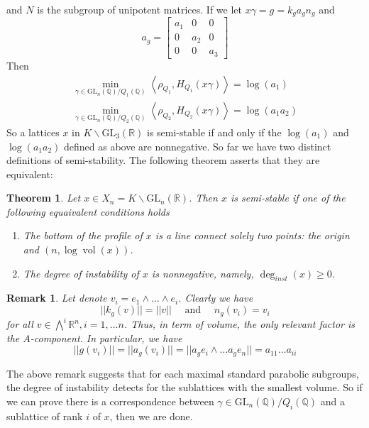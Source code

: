 \documentclass[12pt]{article} %
\newtheorem{theorem}{Theorem}
\newtheorem*{remark}{Remark}
\DeclareMathOperator{\vol}{vol}
\begin{document}
and $N$ is the subgroup of unipotent matrices. If we let $ x\gamma = g = k_ga_gn_g$ and
\[a_g = \begin{bmatrix}
        a_1 & 0   & 0   \\
        0   & a_2 & 0   \\
        0   & 0   & a_3
    \end{bmatrix}\]
Then
\begin{align*}
    \min_{\gamma \in \text{GL}_n(\mathbb{Q})/Q_1(\mathbb{Q})}\left\langle \rho_{Q_1}, H_{Q_1}(x\gamma) \right\rangle = \log(a_1) \\ \min_{\gamma \in \text{GL}_n(\mathbb{Q})/Q_2(\mathbb{Q})}\left\langle \rho_{Q_2}, H_{Q_2}(x\gamma) \right\rangle = \log(a_1a_2)
\end{align*}
So a lattices $x$ in $K \backslash\text{GL}_3(\mathbb{R})$  is semi-stable if and only if the $\log(a_1)$ and $\log(a_1a_2)$ defined as above are nonnegative.
So far we have two distinct definitions of semi-stability. The following theorem asserts that they are equivalent:
\begin{theorem}
    Let $x \in X_n = K \backslash \text{GL}_n(\mathbb{R})$. Then $x$ is semi-stable if one of the following equaivalent
    conditions holds
    \begin{enumerate}
        \item The bottom of the profile of $x$ is a line connect solely two points: the origin and $(n,\log\vol(x))$.
        \item The degree of instability of $x$ is nonnegative, namely, $\deg_{inst}(x) \ge 0$.
    \end{enumerate}
\end{theorem}
\begin{remark}
    Let denote $v_i = e_1 \wedge \ldots \wedge e_i$. Clearly we have
    \[||k_g(v)|| = ||v|| \quad \text{ and } \quad n_g(v_i) =v_i\]
    for all $v \in \bigwedge^i \mathbb{R}^n, i = 1,\ldots n$. Thus, in term of volume, the only
    relevant factor is the $A$-component. In particular, we have
    \[||g(v_i)|| =||a_g(v_i)|| = ||a_ge_i\wedge \ldots a_ge_n|| = a_{11}\ldots a_{ii} \]
\end{remark}
The above remark suggests that for each maximal standard parabolic subgroups, the degree of instability detects
for the sublattices with the smallest volume. So if we can prove there is a correspondence between
$\gamma \in \text{GL}_n(\mathbb{Q})/Q_i(\mathbb{Q})$ and a sublattice of rank $i$ of $x$, then we are done.
\end{document}
